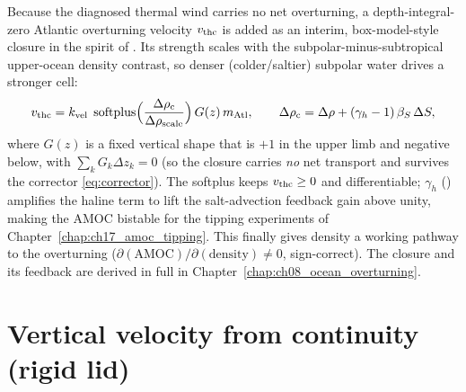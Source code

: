 Because the diagnosed thermal wind carries no net overturning, a depth-integral-zero
Atlantic overturning velocity $v_{\mathrm{thc}}$ is added as an interim,
box-model-style closure in the spirit of \citet{marotzke1991}. Its strength scales
with the subpolar-minus-subtropical upper-ocean density contrast, so denser
(colder/saltier) subpolar water drives a stronger cell:
\begin{equation}
  v_{\mathrm{thc}} = k_{\mathrm{vel}}\;\operatorname{softplus}\!\Big(\frac{\Delta\rho_{\mathrm{c}}}{\Delta\rho_{\mathrm{scale}}}\Big)\,G(z)\,m_{\mathrm{Atl}},
  \qquad
  \Delta\rho_{\mathrm{c}} = \Delta\rho + (\gamma_h-1)\,\beta_S\,\Delta S,
  \label{eq:thc}
\end{equation}
where $G(z)$ is a fixed vertical shape that is $+1$ in the upper limb and negative
below, with $\sum_k G_k\Delta z_k = 0$ (so the closure carries \emph{no} net
transport and survives the corrector \eqref{eq:corrector}). The softplus keeps
$v_{\mathrm{thc}}\ge 0$ and differentiable; $\gamma_h$ ()
amplifies the haline term to lift the salt-advection feedback gain above unity,
making the AMOC bistable for the tipping experiments of
Chapter~\ref{chap:ch17_amoc_tipping}. This finally gives density a working pathway
to the overturning ($\partial(\text{AMOC})/\partial(\text{density})\neq 0$,
sign-correct). The closure and its feedback are derived in full in
Chapter~\ref{chap:ch08_ocean_overturning}.

\section{Vertical velocity from continuity (rigid lid)}\label{sec:w}

